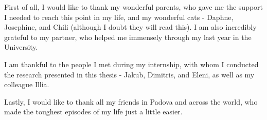 
First of all, I would like to thank my wonderful parents, who gave me the support I needed to reach this point in my life, and my wonderful cats - Daphne, Josephine, and Chili (although I doubt they will read this). I am also incredibly grateful to my partner, who helped me immensely through my last year in the University.

I am thankful to the people I met during my internship, with whom I conducted the research presented in this thesis - Jakub, Dimitris, and Eleni, as well as my colleague Illia.

Lastly, I would like to thank all my friends in Padova and across the world, who made the toughest episodes of my life just a little easier.